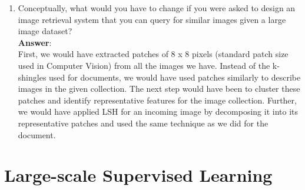 \documentclass[11pt]{article}
\begin{document}
\begin{enumerate}
\item Conceptually, what would you have to change if you were asked to design an image
  retrieval system that you can query for similar images given a large image
  dataset? \\

\textbf{Answer}: \\
First, we would have extracted patches of 8 x 8 pixels
(standard patch size used in Computer Vision) from all the images we
have. Instead of the k-shingles used for documents, we would have used patches
similarly to describe images in the given collection. The next step
would have been to cluster these patches and identify representative features
for the image collection. Further, we would have applied LSH for an
incoming image by decomposing it into its representative patches and
used the same technique as we did for the document.

\end{enumerate}

\section{Large-scale Supervised Learning}
\end{document}
